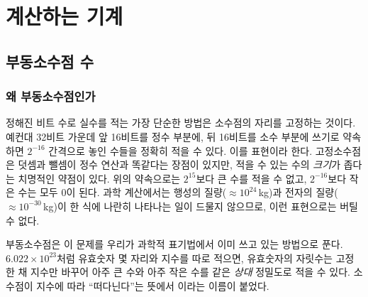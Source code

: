\part{계산하는 기계}

\chapter{부동소수점 수}
\label{ch:float}


\section{왜 부동소수점인가}
\label{sec:why-float}

정해진 비트 수로 실수를 적는 가장 단순한 방법은 소수점의 자리를 고정하는 것이다. 예컨대 32비트 가운데 앞 16비트를 정수 부분에, 뒤 16비트를 소수 부분에 쓰기로 약속하면 $2^{-16}$ 간격으로 놓인 수들을 정확히 적을 수 있다. 이를  표현이라 한다. 고정소수점은 덧셈과 뺄셈이 정수 연산과 똑같다는 장점이 있지만, 적을 수 있는 수의 \emph{크기}가 좁다는 치명적인 약점이 있다. 위의 약속으로는 $2^{15}$보다 큰 수를 적을 수 없고, $2^{-16}$보다 작은 수는 모두 0이 된다. 과학 계산에서는 행성의 질량($\approx 10^{24}$\,kg)과 전자의 질량($\approx 10^{-30}$\,kg)이 한 식에 나란히 나타나는 일이 드물지 않으므로, 이런 표현으로는 버틸 수 없다.

부동소수점은 이 문제를 우리가 과학적 표기법에서 이미 쓰고 있는 방법으로 푼다. $6.022\times10^{23}$처럼 유효숫자 몇 자리와 지수를 따로 적으면, 유효숫자의 자릿수는 고정한 채 지수만 바꾸어 아주 큰 수와 아주 작은 수를 같은 \emph{상대} 정밀도로 적을 수 있다. 소수점이 지수에 따라 ``떠다닌다''는 뜻에서 이라는 이름이 붙었다.

